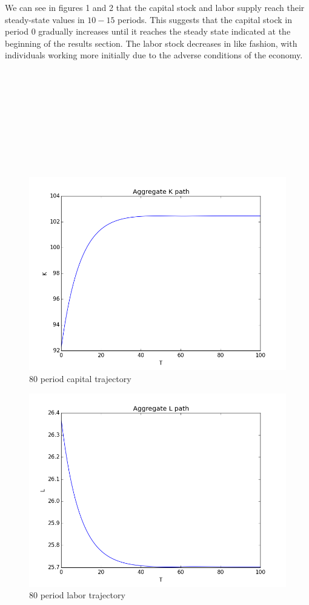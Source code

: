 \documentclass[letterpaper,12pt]{article}
\theoremstyle{definition}
\begin{document}
We can see in figures 1 and 2 that the capital stock and labor supply reach their steady-state values in $10-15$ periods. This suggests that the capital stock in period $0$ gradually increases until it reaches the steady state indicated at the beginning of the results section. The labor stock decreases in like fashion, with individuals working more initially due to the adverse conditions of the economy.\\\\
\\\\
\\\\\\\\\\\\




\begin{figure}[h] 
\includegraphics[scale = .5]{80periodK.png}
\centering 
\caption{80 period capital trajectory}
\end{figure}
\begin{figure}[h] 
\includegraphics[scale = .5]{80periodL.png}
\centering 
\caption{80 period labor trajectory}
\end{figure}
\end{document}
